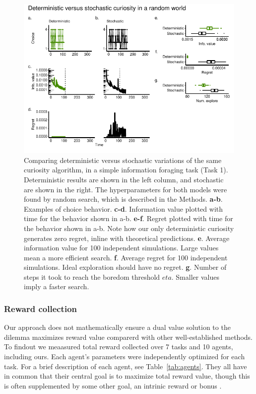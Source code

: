 \begin{figure}
	\begin{fullwidth}
	\includegraphics[width=1.0\linewidth]{img/curiosity1.pdf} 
	\caption{Comparing deterministic versus stochastic variations of the same curiosity algorithm, in a simple information foraging task (Task 1). Deterministic results are shown in the left column, and stochastic are shown in the right. The hyperparameters for both models were found by random search, which is described in the Methods.
	\textbf{a-b}. Examples of choice behavior.
	\textbf{c-d}. Information value plotted with time for the behavior shown in a-b.
	\textbf{e-f}. Regret plotted with time for the behavior shown in a-b. Note how our only deterministic curiosity generates zero regret, inline with theoretical predictions.
	\textbf{e}. Average information value for 100 independent simulations. Large values mean a more efficient search.
	\textbf{f}. Average regret for 100 independent simulations. Ideal exploration should have no regret. 
	\textbf{g}. Number of steps it took to reach the boredom threshold $eta$. Smaller values imply a faster search.
	}
	\label{fig:curiosity1} 
	\end{fullwidth}
\end{figure}


\subsubsection*{Reward collection} 
Our approach does not mathematically ensure a dual value solution to the dilemma maximizes reward value comparerd with other well-established methods. To findout we meaasured total reward collected over 7 tasks and 10 agents, including ours. Each agent's parameters were independently optimized for each task. For a brief description of each agent, see Table~\ref{tab:agents}. They all have in common that their central goal is to maximize total reward value, though this is often supplemented by some other goal, an intrinic reward or bonus \cite{Ng1999,Sutton1998}. 

